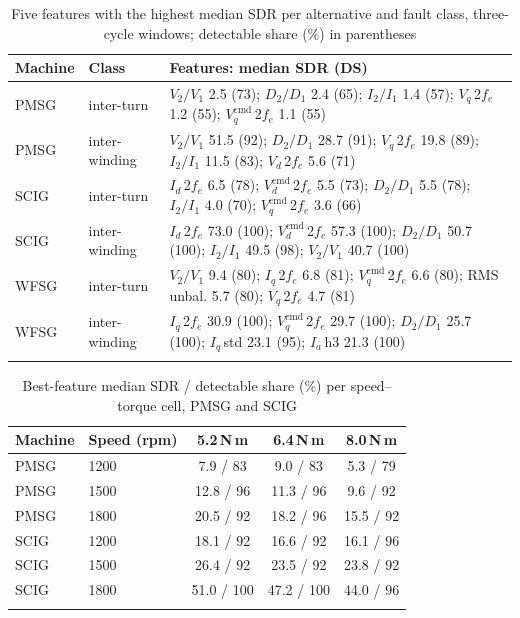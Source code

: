 \begin{table}[t]
\tabsize
\caption{Five features with the highest median SDR per alternative and fault class, three-cycle windows; detectable share (\%) in parentheses}\label{tab:topfeat}
\begin{tabular}{@{}llp{7.6cm}@{}}
\toprule
Machine & Class & Features: median SDR (DS) \\
\midrule
PMSG & inter-turn & $V_2/V_1$ 2.5 (73); $D_2/D_1$ 2.4 (65); $I_2/I_1$ 1.4 (57); $V_q$\,2$f_e$ 1.2 (55); $V_q^{\mathrm{cmd}}$\,2$f_e$ 1.1 (55) \\
PMSG & inter-winding & $V_2/V_1$ 51.5 (92); $D_2/D_1$ 28.7 (91); $V_q$\,2$f_e$ 19.8 (89); $I_2/I_1$ 11.5 (83); $V_d$\,2$f_e$ 5.6 (71) \\
SCIG & inter-turn & $I_d$\,2$f_e$ 6.5 (78); $V_d^{\mathrm{cmd}}$\,2$f_e$ 5.5 (73); $D_2/D_1$ 5.5 (78); $I_2/I_1$ 4.0 (70); $V_q^{\mathrm{cmd}}$\,2$f_e$ 3.6 (66) \\
SCIG & inter-winding & $I_d$\,2$f_e$ 73.0 (100); $V_d^{\mathrm{cmd}}$\,2$f_e$ 57.3 (100); $D_2/D_1$ 50.7 (100); $I_2/I_1$ 49.5 (98); $V_2/V_1$ 40.7 (100) \\
WFSG & inter-turn & $V_2/V_1$ 9.4 (80); $I_q$\,2$f_e$ 6.8 (81); $V_q^{\mathrm{cmd}}$\,2$f_e$ 6.6 (80); RMS unbal. 5.7 (80); $V_q$\,2$f_e$ 4.7 (81) \\
WFSG & inter-winding & $I_q$\,2$f_e$ 30.9 (100); $V_q^{\mathrm{cmd}}$\,2$f_e$ 29.7 (100); $D_2/D_1$ 25.7 (100); $I_q$\,std 23.1 (95); $I_a$\,h3 21.3 (100) \\
\botrule
\end{tabular}
\end{table}

\begin{table}[t]
\tabsize
\caption{Best-feature median SDR / detectable share (\%) per speed--torque cell, PMSG and SCIG}\label{tab:opgrid}
\begin{tabular}{@{}llccc@{}}
\toprule
Machine & Speed (rpm) & 5.2\,N\,m & 6.4\,N\,m & 8.0\,N\,m \\
\midrule
PMSG & 1200 & 7.9 / 83 & 9.0 / 83 & 5.3 / 79 \\
PMSG & 1500 & 12.8 / 96 & 11.3 / 96 & 9.6 / 92 \\
PMSG & 1800 & 20.5 / 92 & 18.2 / 96 & 15.5 / 92 \\
SCIG & 1200 & 18.1 / 92 & 16.6 / 92 & 16.1 / 96 \\
SCIG & 1500 & 26.4 / 92 & 23.5 / 92 & 23.8 / 92 \\
SCIG & 1800 & 51.0 / 100 & 47.2 / 100 & 44.0 / 96 \\
\botrule
\end{tabular}
\end{table}

